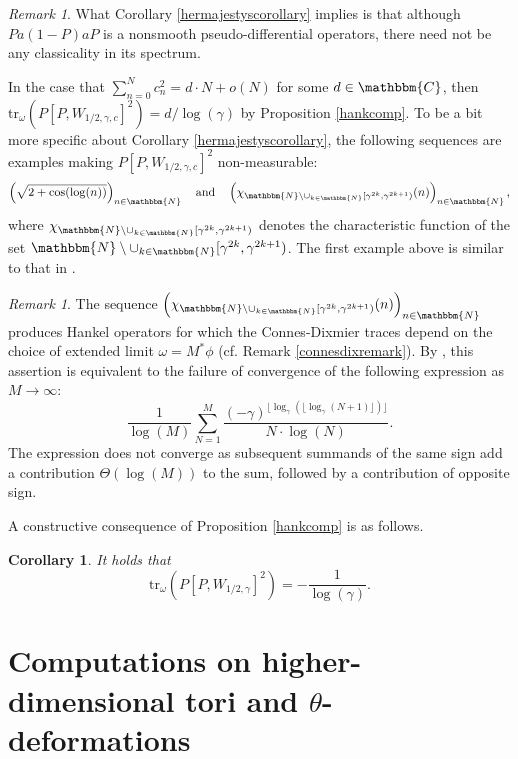 \documentclass[10pt]{amsart}
\newtheorem{cor}[thm]{Corollary}
\theoremstyle{remark}
\newtheorem{remark}[thm]{Remark}
\theoremstyle{definition}
\begin{document}
\begin{remark}
What Corollary \ref{hermajestyscorollary} implies is that although $Pa(1-P)aP$ is a nonsmooth pseudo-differential operators, there need not be any classicality in its spectrum.
\end{remark}

In the case that $\sum_{n=0}^{N} c_n^2=d\cdot N+o(N)$ for some $d\in {\mathbbm{C}}$, then ${\mathrm{t}\mathrm{r}}_\omega(P[P,W_{1/2,\gamma,c}]^2)=d/\log(\gamma)$ by Proposition \ref{hankcomp}. To be a bit more specific about Corollary \ref{hermajestyscorollary}, the following sequences are examples making $P[P,W_{1/2,\gamma,c}]^2$ non-measurable:
$$\left(\sqrt{2+\cos(\log(n))}\right)_{n\in {\mathbbm{N}}} \quad \mbox{and} \quad \left(\chi_{ {\mathbbm{N}}\setminus \cup_{k\in {\mathbbm{N}}}[\gamma^{2k},\gamma^{2k+1})}(n)\right)_{n\in {\mathbbm{N}}},$$
where $\chi_{{\mathbbm{N}}\setminus \cup_{k\in {\mathbbm{N}}}[\gamma^{2k},\gamma^{2k+1})}$ denotes the characteristic function of the set $ {\mathbbm{N}}\setminus \cup_{k\in {\mathbbm{N}}}[\gamma^{2k},\gamma^{2k+1})$. The first example above is similar to that in \cite[Corollary 11.5.3]{sukolord}.

\begin{remark}
\label{weirdsequences}
The sequence $ \left(\chi_{ {\mathbbm{N}}\setminus \cup_{k\in {\mathbbm{N}}}[\gamma^{2k},\gamma^{2k+1})}(n)\right)_{n\in {\mathbbm{N}}}$ produces Hankel operators for which the Connes-Dixmier traces depend on the choice of extended limit $\omega=M^*\phi$ (cf. Remark \ref{connesdixremark}). By \cite[Proposition 6, Chapter II.$\beta$]{c}, this assertion is equivalent to the failure of convergence of the following expression as $M\to \infty$:
$$\frac{1}{\log(M)}\sum_{N=1}^M \frac{(-\gamma)^{\lfloor \log_\gamma(\lfloor \log_\gamma(N+1)\rfloor)\rfloor}}{N\cdot \log(N)}.$$
The expression does not converge as subsequent summands of the same sign add a contribution $\Theta(\log(M))$ to the sum, followed by a contribution of opposite sign.
\end{remark}

A constructive consequence of Proposition \ref{hankcomp} is as follows.

\begin{cor}
It holds that
$${\mathrm{t}\mathrm{r}}_\omega(P[P,W_{1/2,\gamma}]^2)=-\frac{1}{\log(\gamma)}.$$
\end{cor}

\large
\section{Computations on higher-dimensional tori and $\theta$-deformations}
\label{sectiontheta}
\normalsize
\end{document}
